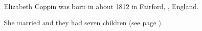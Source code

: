 
Elizabeth Coppin was born in about 1812 in Fairford, , England.\cite{Census1861Merrett}

She married \cite{PeterKarpinski_2016-04-04} and they had seven children (see page \pageref{James_Merrett}).
